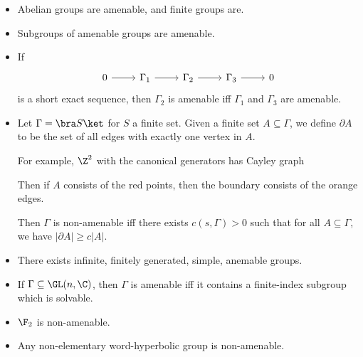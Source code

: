 \documentclass[a4paper]{article}
\begin{document}
\begin{eg}\leavevmode
  \begin{itemize}
    \item Abelian groups are amenable, and finite groups are.
    \item Subgroups of amenable groups are amenable.
    \item If
      \[
        \begin{tikzcd}
          0 \ar[r] & \Gamma_1 \ar[r] & \Gamma_2 \ar[r] & \Gamma_3 \ar[r] & 0
        \end{tikzcd}
      \]
      is a short exact sequence, then $\Gamma_2$ is amenable iff $\Gamma_1$ and $\Gamma_3$ are amenable.
    \item Let $\Gamma = \bra S \ket$ for $S$ a finite set. Given a finite set $A \subseteq \Gamma$, we define $\partial A$ to be the set of all edges with exactly one vertex in $A$.

      For example, $\Z^2$ with the canonical generators has Cayley graph
      \begin{center}
      \end{center}
      Then if $A$ consists of the red points, then the boundary consists of the orange edges.

      Then $\Gamma$ is non-amenable iff there exists $c (s, \Gamma) > 0$ such that for all $A \subseteq \Gamma$, we have $|\partial A| \geq c|A|$.
    \item There exists infinite, finitely generated, simple, anemable groups.
    \item If $\Gamma \subseteq \GL(n, \C)$, then $\Gamma$ is amenable iff it contains a finite-index subgroup which is solvable.
    \item $\F_2$ is non-amenable.
    \item Any non-elementary word-hyperbolic group is non-amenable.
  \end{itemize}
\end{eg}
\end{document}
